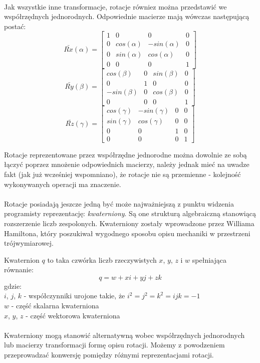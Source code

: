 \documentclass[licencjacka]{pracamgr}
\begin{document}
\\
Jak wszystkie inne transformacje, rotacje równiez można przedstawić we współrzędnych jednorodnych. Odpowiednie macierze mają wówczas następującą postać:
$$
\bar{Rx}(\alpha) = 
\begin{bmatrix}
1 & 0 & 0 & 0 \\
0 & cos(\alpha) & -sin(\alpha) & 0 \\
0 & sin(\alpha) & cos(\alpha) & 0 \\
0 & 0 & 0 & 1
\end{bmatrix}
$$
$$
\bar{Ry}(\beta) = 
\begin{bmatrix}
cos(\beta) & 0 & sin(\beta) & 0 \\
0 & 1 & 0 & 0 \\
-sin(\beta) & 0 & cos(\beta) & 0 \\
0 & 0 & 0 & 1
\end{bmatrix}
$$
$$
\bar{Rz}(\gamma) = 
\begin{bmatrix}
cos(\gamma) & -sin(\gamma) & 0 & 0 \\
sin(\gamma) & cos(\gamma) & 0 & 0 \\
0 & 0 & 1 & 0 \\
0 & 0 & 0 & 1
\end{bmatrix}
$$

Rotacje reprezentowane przez współrzędne jednorodne można dowolnie ze sobą łączyć poprzez mnożenie odpowiednich macierzy, należy jednak mieć na uwadze fakt (jak już wcześniej wspomniano), że rotacje nie są przemienne - kolejność wykonywanych operacji ma znaczenie.
\\
\\
Rotacje posiadają jeszcze jedną być może najważniejszą z punktu widzenia programisty reprezentację: \textit{kwaterniony}. Są one strukturą algebraiczną stanowiącą rozszerzenie liczb zespolonych. Kwaterniony zostały wprowadzone przez Williama Hamiltona, który poszukiwał wygodnego sposobu opisu mechaniki w przestrzeni trójwymiarowej. 

Kwaternion $q$ to taka czwórka liczb rzeczywistych $x$, $y$, $z$ i $w$ spełniająca równanie:
$$
q=w+xi+yj+zk
$$
gdzie:
\\
$i$, $j$, $k$ - współczynniki urojone takie, że $i^2=j^2=k^2=ijk=-1$
\\
$w$ - część skalarna kwaterniona
\\
$x$, $y$, $z$ - część wektorowa kwaterniona
\\
\\
Kwaterniony mogą stanowić alternatywną wobec współrzędnych jednorodnych lub macierzy transformacji formę opisu rotacji. Możemy z powodzeniem przeprowadzać konwersję pomiędzy różnymi reprezentacjami rotacji.
\end{document}
